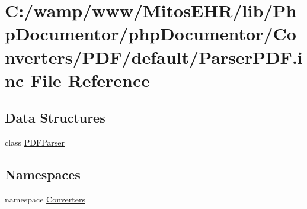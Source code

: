 \hypertarget{_parser_p_d_f_8inc}{\section{\-C\-:/wamp/www/\-Mitos\-E\-H\-R/lib/\-Php\-Documentor/php\-Documentor/\-Converters/\-P\-D\-F/default/\-Parser\-P\-D\-F.inc \-File \-Reference}
\label{_parser_p_d_f_8inc}
}
\subsection*{\-Data \-Structures}
\begin{DoxyCompactItemize}
\item 
class \hyperlink{class_p_d_f_parser}{\-P\-D\-F\-Parser}
\end{DoxyCompactItemize}
\subsection*{\-Namespaces}
\begin{DoxyCompactItemize}
\item 
namespace \hyperlink{namespace_converters}{\-Converters}
\end{DoxyCompactItemize}
